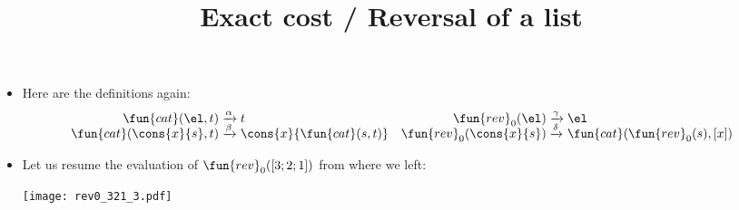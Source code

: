 \documentclass[wide]{slides}
\begin{document}
\begin{slide}
  \title{Exact cost / Reversal of a list}

  \begin{itemize}

    \item Here are the definitions again:
      \begin{equation*}
        \begin{array}{@{}r@{\;}l@{\;}lr@{\;}l@{\;}l@{}}
          \fun{cat}(\el,t)
          & \xrightarrow{\alpha} & t
          & \fun{rev}_0(\el)
          & \xrightarrow{\smash{\gamma}} & \el\\
          \fun{cat}(\cons{x}{s},t)
          & \xrightarrow{\smash{\beta}} & \cons{x}{\fun{cat}(s,t)}
          & \fun{rev}_0(\cons{x}{s})
          & \xrightarrow{\smash{\delta}} & \fun{cat}(\fun{rev}_0(s),[x])
        \end{array}
      \end{equation*}

      \item Let us resume the evaluation of \(\fun{rev}_0([3;2;1])\)
        from where we left:
        \begin{center}
          \texttt{[image: rev0\_321\_3.pdf]}
        \end{center}

  \end{itemize}

\end{slide}
\end{document}
